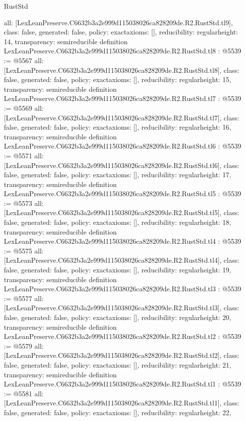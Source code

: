 \begin{lexlean}{RustStd}
\begin{coremodule}
{  all: [LexLeanPreserve.C6632b3a2e999d115038026ca828209de.R2.RustStd.tl9],
  class: false,
  generated: false,
  policy: exact{axioms: []},
  reducibility: regular{height: 14},
  transparency: semireducible
}
definition LexLeanPreserve.C6632b3a2e999d115038026ca828209de.R2.RustStd.tl8 : @5539 := @5567 {
  all: [LexLeanPreserve.C6632b3a2e999d115038026ca828209de.R2.RustStd.tl8],
  class: false,
  generated: false,
  policy: exact{axioms: []},
  reducibility: regular{height: 15},
  transparency: semireducible
}
definition LexLeanPreserve.C6632b3a2e999d115038026ca828209de.R2.RustStd.tl7 : @5539 := @5569 {
  all: [LexLeanPreserve.C6632b3a2e999d115038026ca828209de.R2.RustStd.tl7],
  class: false,
  generated: false,
  policy: exact{axioms: []},
  reducibility: regular{height: 16},
  transparency: semireducible
}
definition LexLeanPreserve.C6632b3a2e999d115038026ca828209de.R2.RustStd.tl6 : @5539 := @5571 {
  all: [LexLeanPreserve.C6632b3a2e999d115038026ca828209de.R2.RustStd.tl6],
  class: false,
  generated: false,
  policy: exact{axioms: []},
  reducibility: regular{height: 17},
  transparency: semireducible
}
definition LexLeanPreserve.C6632b3a2e999d115038026ca828209de.R2.RustStd.tl5 : @5539 := @5573 {
  all: [LexLeanPreserve.C6632b3a2e999d115038026ca828209de.R2.RustStd.tl5],
  class: false,
  generated: false,
  policy: exact{axioms: []},
  reducibility: regular{height: 18},
  transparency: semireducible
}
definition LexLeanPreserve.C6632b3a2e999d115038026ca828209de.R2.RustStd.tl4 : @5539 := @5575 {
  all: [LexLeanPreserve.C6632b3a2e999d115038026ca828209de.R2.RustStd.tl4],
  class: false,
  generated: false,
  policy: exact{axioms: []},
  reducibility: regular{height: 19},
  transparency: semireducible
}
definition LexLeanPreserve.C6632b3a2e999d115038026ca828209de.R2.RustStd.tl3 : @5539 := @5577 {
  all: [LexLeanPreserve.C6632b3a2e999d115038026ca828209de.R2.RustStd.tl3],
  class: false,
  generated: false,
  policy: exact{axioms: []},
  reducibility: regular{height: 20},
  transparency: semireducible
}
definition LexLeanPreserve.C6632b3a2e999d115038026ca828209de.R2.RustStd.tl2 : @5539 := @5579 {
  all: [LexLeanPreserve.C6632b3a2e999d115038026ca828209de.R2.RustStd.tl2],
  class: false,
  generated: false,
  policy: exact{axioms: []},
  reducibility: regular{height: 21},
  transparency: semireducible
}
definition LexLeanPreserve.C6632b3a2e999d115038026ca828209de.R2.RustStd.tl1 : @5539 := @5581 {
  all: [LexLeanPreserve.C6632b3a2e999d115038026ca828209de.R2.RustStd.tl1],
  class: false,
  generated: false,
  policy: exact{axioms: []},
  reducibility: regular{height: 22},
}
\end{coremodule}
\end{lexlean}
